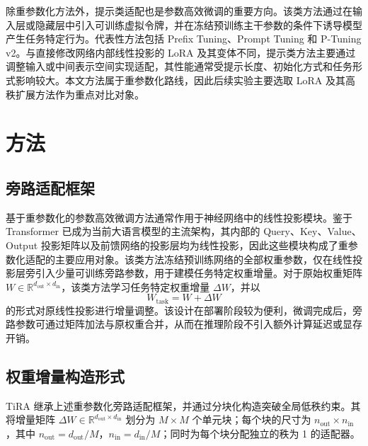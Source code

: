 ﻿\documentclass[UTF8,a4paper,11pt]{ctexart}
\newcommand{\R}{\mathbb{R}}
\newcommand{\DeltaW}{\Delta W}
\begin{document}
除重参数化方法外，提示类适配也是参数高效微调的重要方向。该类方法通过在输入层或隐藏层中引入可训练虚拟令牌，并在冻结预训练主干参数的条件下诱导模型产生任务特定行为。代表性方法包括 Prefix Tuning\cite{li2021prefix}、Prompt Tuning\cite{lester2021power} 和 P-Tuning v2\cite{xiao2022ptuning}。与直接修改网络内部线性投影的 LoRA 及其变体不同，提示类方法主要通过调整输入或中间表示空间实现适配，其性能通常受提示长度、初始化方式和任务形式影响较大。本文方法属于重参数化路线，因此后续实验主要选取 LoRA 及其高秩扩展方法作为重点对比对象。

\section{方法}

\subsection{旁路适配框架}

基于重参数化的参数高效微调方法通常作用于神经网络中的线性投影模块。鉴于 Transformer\cite{vaswani2017attention} 已成为当前大语言模型的主流架构，其内部的 Query、Key、Value、Output 投影矩阵以及前馈网络的投影层均为线性投影，因此这些模块构成了重参数化适配的主要应用对象。该类方法冻结预训练网络的全部权重参数，仅在线性投影层旁引入少量可训练旁路参数，用于建模任务特定权重增量。对于原始权重矩阵 $W\in\R^{d_{\mathrm{out}}\times d_{\mathrm{in}}}$，该类方法学习任务特定权重增量 $\DeltaW$，并以
\begin{equation}
    W_{\mathrm{task}} = W + \DeltaW
\end{equation}
的形式对原线性投影进行增量调整。该设计在部署阶段较为便利，微调完成后，旁路参数可通过矩阵加法与原权重合并，从而在推理阶段不引入额外计算延迟或显存开销。

\subsection{权重增量构造形式}

TiRA 继承上述重参数化旁路适配框架，并通过分块化构造突破全局低秩约束。其将增量矩阵 $\DeltaW\in\R^{d_{\mathrm{out}}\times d_{\mathrm{in}}}$ 划分为 $M\times M$ 个单元块；每个块的尺寸为 $n_{\mathrm{out}}\times n_{\mathrm{in}}$，其中 $n_{\mathrm{out}}=d_{\mathrm{out}}/M$，$n_{\mathrm{in}}=d_{\mathrm{in}}/M$；同时为每个块分配独立的秩为 1 的适配器。
\end{document}
